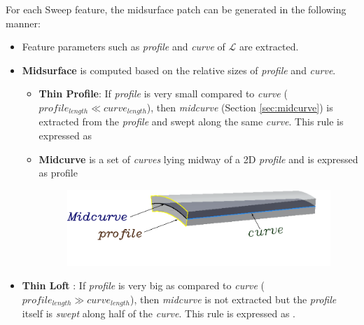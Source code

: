 For each Sweep feature, the midsurface patch can be generated in the following manner: 

\begin{itemize}[noitemsep,topsep=2pt,parsep=2pt,partopsep=2pt]

\item  Feature parameters such as {\em profile} and {\em curve} of {\bf $\mathcal{L}$} are extracted.

\item {\bf Midsurface} is computed based on the relative sizes of {\em profile} and {\em curve}.

\begin{itemize}[noitemsep,topsep=2pt,parsep=2pt,partopsep=2pt]

\item {\bf Thin Profile}: If {\em profile} is very small compared to {\em curve} ( $profile_{length} \ll curve_{length}$), then {\em midcurve} (Section \ref{sec:midcurve}) is extracted from the {\em profile} and swept  along the same {\em curve}. This rule is expressed as  

\item {\bf Midcurve} is a set of {\em curves} lying midway of a 2D {\em profile} and is expressed as 	 {profile} 


\begin{figure}[h]
\centering \includegraphics[scale=0.5]{../Common/images//MidsurfSmallProfile_1.pdf} 
\label{figure_MidsurfSmallProfile}
\end{figure}


\end{itemize}

\item {\bf Thin Loft} :  If {\em profile} is very big as compared to {\em curve} ($profile_{length} \gg curve_{length}$), then {\em midcurve} is not extracted  but the {\em profile} itself is {\em swept} along half of the {\em curve}. This rule is expressed as .
%


\end{itemize}
